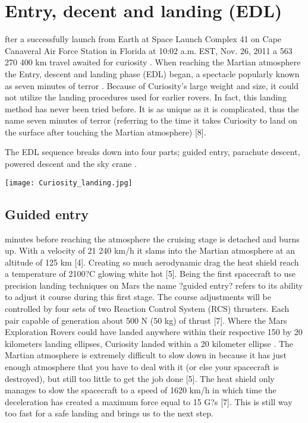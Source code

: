 \section*{Entry, decent and landing (EDL)}
fter a successfully launch from Earth at Space Launch Complex 41 on Cape Canaveral Air Force Station in Florida at 10:02 a.m. EST, Nov. 26, 2011 a 563 270 400 km travel awaited for curiosity \cite{MissionTimeline} \cite{CNNCuriosity}.
When reaching the Martian atmosphere the Entry, descent and landing phase (EDL) began, a spectacle popularly known as seven minutes of terror \cite{CNNCuriosity}.
Because of Curiosity's large weight and size, it could not utilize the landing procedures used for earlier rovers.
In fact, this landing method has never been tried before.
It is as unique as it is complicated, thus the name seven minutes of terror (referring to the time it takes Curiosity to land on the surface after touching the Martian atmosphere) [8].

The EDL sequence breaks down into four parts; guided entry, parachute descent, powered descent and the sky crane \cite{NASALanding}.

\begin{center}
\texttt{[image: Curiosity\_landing.jpg]}
\end{center}


\subsection*{Guided entry}
 minutes before reaching the atmosphere the cruising stage is detached and burns up.
With a velocity of 21 240 km/h it slams into the Martian atmosphere at an altitude of 125 km [4]. Creating so much aerodynamic drag the heat shield reach a temperature of 2100?C glowing white hot \cite{NASALanding} [5]. Being the first spacecraft to use precision landing techniques on Mars the name ?guided entry? refers to its ability to adjust it course during this first stage. The course adjustments will be controlled by four sets of two Reaction Control System (RCS) thrusters. Each pair capable of generation about 500 N (50 kg) of thrust [7]. Where the Mars Exploration Rovers could have landed anywhere within their respective 150 by 20 kilometers landing ellipses, Curiosity landed within a 20 kilometer ellipse \cite{NASALanding}.
The Martian atmosphere is extremely difficult to slow down in because it has just enough atmosphere that you have to deal with it (or else your spacecraft is destroyed), but still too little to get the job done [5]. The heat shield only manages to slow the spacecraft to a speed of 1620 km/h in which time the deceleration has created a maximum force equal to 15 G?s \cite{NASALanding} [7]. This is still way too fast for a safe landing and brings us to the next step.


